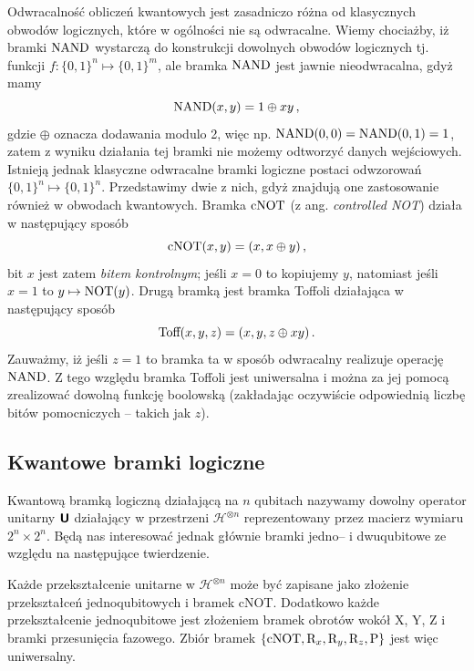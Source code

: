 \documentclass{myclass}
\begin{document}
Odwracalność obliczeń kwantowych jest zasadniczo różna od klasycznych obwodów logicznych, które w
ogólności nie są odwracalne. Wiemy chociażby, iż bramki \(\text{NAND}\) wystarczą do konstrukcji
dowolnych obwodów logicznych tj. funkcji \(f:\{0,1\}^n \mapsto \{0,1\}^m\), ale bramka
\(\text{NAND}\) jest jawnie nieodwracalna, gdyż mamy
\begin{equation*}
    \text{NAND}(x,y) = 1 \oplus xy\,,
\end{equation*}
gdzie \(\oplus\) oznacza dodawania modulo 2, więc np. \(\text{NAND}(0,0) = \text{NAND}(0,1) =
1\), zatem z wyniku działania tej bramki nie możemy odtworzyć danych wejściowych. Istnieją jednak
klasyczne odwracalne bramki logiczne postaci odwzorowań \(\{0,1\}^n\mapsto\{0,1\}^n\). Przedstawimy
dwie z nich, gdyż znajdują one zastosowanie również w obwodach kwantowych. Bramka \(\text{cNOT}\)
(z ang. \textit{controlled NOT}) działa w następujący sposób
\begin{equation*}
    \text{cNOT}(x,y) = (x, x\oplus y)\,,
\end{equation*}
bit \(x\) jest zatem \textit{bitem kontrolnym}; jeśli \(x=0\) to kopiujemy \(y\), natomiast jeśli
\(x=1\) to \(y \mapsto \text{NOT}(y)\). Drugą bramką jest bramka Toffoli działająca w następujący
sposób
\begin{equation*}
    \text{Toff}(x,y,z) = (x,y,z\oplus xy)\,.
\end{equation*}
Zauważmy, iż jeśli \(z=1\) to bramka ta w sposób odwracalny realizuje operację \(\text{NAND}\). Z
tego względu bramka Toffoli jest uniwersalna i można za jej pomocą zrealizować dowolną funkcję
boolowską (zakładając oczywiście odpowiednią liczbę bitów pomocniczych -- takich jak \(z\)).


\subsection{Kwantowe bramki logiczne}

Kwantową bramką logiczną działającą na \(n\) qubitach nazywamy dowolny operator unitarny
\(\boldsymbol{\mathsf{U}}\) działający w przestrzeni \(\mathscr{H}^{\otimes n}\) reprezentowany przez macierz
wymiaru \(2^n\times2^n\). Będą nas interesować jednak głównie bramki jedno-- i dwuqubitowe ze
względu na następujące twierdzenie.
\begin{theorem}
    Każde przekształcenie unitarne w \(\mathscr{H}^{\otimes n}\) może być zapisane jako złożenie
    przekształceń jednoqubitowych i bramek cNOT. Dodatkowo każde przekształcenie jednoqubitowe jest
    złożeniem bramek obrotów wokół X, Y, Z i bramki przesunięcia fazowego. Zbiór bramek
    \(\{\text{cNOT}, \text{R}_x, \text{R}_y, \text{R}_z, \text{P}\}\) jest więc
    uniwersalny.
\end{theorem}
\end{document}
